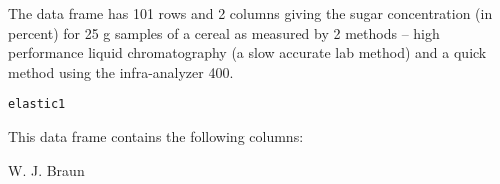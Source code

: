 \begin{Description}\relax
The  data frame has 101 rows and 2 columns
giving the sugar concentration (in percent) for 25 g samples
of a cereal as measured by 2 methods -- high performance liquid
chromatography (a slow accurate lab method) and a quick method
using the infra-analyzer 400.
\end{Description}
\begin{Usage}
\begin{verbatim}elastic1\end{verbatim}
\end{Usage}
\begin{Format}\relax
This data frame contains the following columns:
\end{Format}
\begin{Source}\relax
W. J. Braun
\end{Source}


